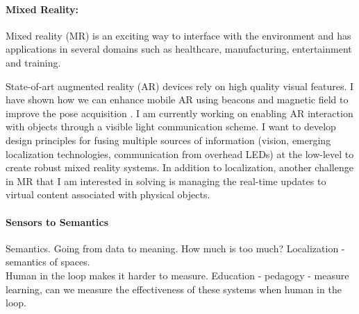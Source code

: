 \documentclass[11pt]{article}
\begin{document}
\paragraph{Mixed Reality: }
Mixed reality (MR) is an exciting way to interface with the environment and has applications in several domains such as healthcare, manufacturing, entertainment and training. %
 
State-of-art augmented reality (AR) devices rely on high quality visual features. %
I have shown how we can enhance mobile AR using beacons and magnetic field to improve the pose acquisition \cite{mobileAR}. I am currently working on enabling AR interaction with objects through a visible light communication scheme. I want to develop design principles for fusing multiple sources of information (vision, emerging localization technologies, communication from overhead LEDs) at the low-level to create robust mixed reality systems. %
In addition to localization, another challenge in MR that I am interested in solving is managing the real-time updates to virtual content associated with physical objects. 

\paragraph{Sensors to Semantics}
Semantics. Going from data to meaning. 
How much is too much?
Localization - semantics of spaces.\\
Human in the loop makes it harder to measure. Education - pedagogy - measure learning, can we measure the effectiveness of these systems when human in the loop.
\end{document}

